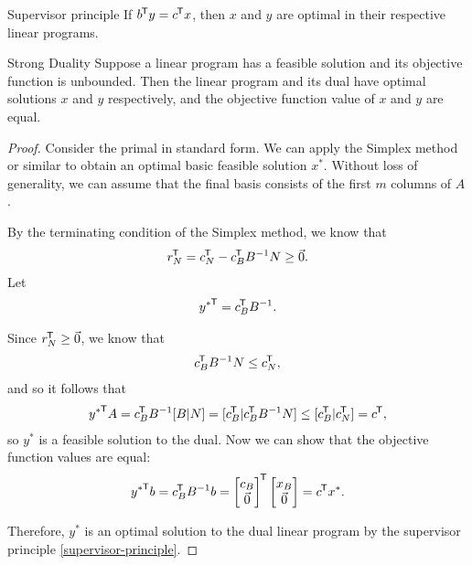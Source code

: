 \begin{cor}{Supervisor principle}\label{supervisor-principle}\proofbreak
    If $b^{\mkern-1.5mu\mathsf{T}}y = c^{\mkern-1.5mu\mathsf{T}}x$, then $x$ and $y$ are optimal in their respective linear programs.
\end{cor}

\begin{thm}{Strong Duality}\label{strong-duality}\proofbreak
    Suppose a linear program has a feasible solution and its objective function is unbounded. Then the linear program and its dual have optimal solutions $x$ and $y$ respectively, and the objective function value of $x$ and $y$ are equal.
\end{thm}

\begin{proof}
    Consider the primal in standard form. We can apply the Simplex method or similar to obtain an optimal basic feasible solution $x^*$. Without loss of generality, we can assume that the final basis consists of the first $m$ columns of $A$.

    By the terminating condition of the Simplex method, we know that
    \begin{align*}
        r_N^{\mkern-1.5mu\mathsf{T}} = c_N^{\mkern-1.5mu\mathsf{T}} - c_B^{\mkern-1.5mu\mathsf{T}}B^{-1}N \geq \vec{0}.
    \end{align*}
    Let
    \begin{align*}
        {y^*}^{\mkern-1.5mu\mathsf{T}} = c_B^{\mkern-1.5mu\mathsf{T}}B^{-1}.
    \end{align*}

    Since $r_N^{\mkern-1.5mu\mathsf{T}} \geq \vec{0}$, we know that
    \begin{align*}
        c_B^{\mkern-1.5mu\mathsf{T}}B^{-1}N \leq c_N^{\mkern-1.5mu\mathsf{T}},
    \end{align*}
    and so it follows that
    \begin{align*}
        {y^*}^{\mkern-1.5mu\mathsf{T}}A = c_B^{\mkern-1.5mu\mathsf{T}}B^{-1}[B|N] = [c_B^{\mkern-1.5mu\mathsf{T}}|c_B^{\mkern-1.5mu\mathsf{T}}B^{-1}N] \leq [c_B^{\mkern-1.5mu\mathsf{T}}|c_N^{\mkern-1.5mu\mathsf{T}}] = c^{\mkern-1.5mu\mathsf{T}},
    \end{align*}
    so $y^*$ is a feasible solution to the dual. Now we can show that the objective function values are equal:
    \begin{align*}
        {y^{*}}^{\mkern-1.5mu\mathsf{T}}b = c_B^{\mkern-1.5mu\mathsf{T}}B^{-1}b = \begin{bmatrix}c_B \\ \vec{0}\end{bmatrix}^{\mkern-1.5mu\mathsf{T}}\begin{bmatrix}x_B \\ \vec{0}\end{bmatrix} = c^{\mkern-1.5mu\mathsf{T}}x^*.
    \end{align*}

    Therefore, $y^*$ is an optimal solution to the dual linear program by the supervisor principle \ref{supervisor-principle}.
\end{proof}

